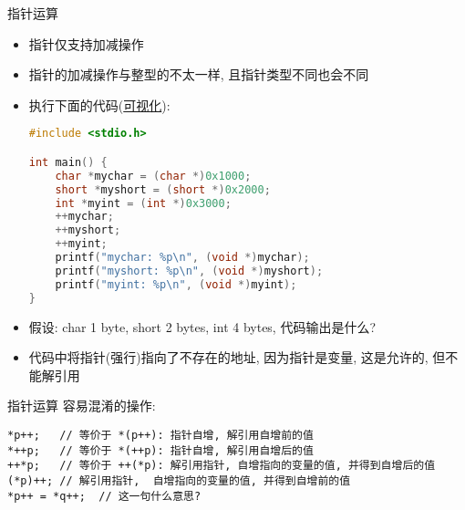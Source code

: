 \begin{frame}[fragile]{指针运算}
    \begin{itemize}[<+- | alert@+>]
        \item 指针仅支持加减操作
        \item 指针的加减操作与整型的不太一样, 且指针类型不同也会不同
        \item 执行下面的代码(\href{http://pythontutor.com/c.html#code=\%23include\%20\%3Cstdio.h\%3E\%0A\%0Aint\%20main\%28\%29\%20\%7B\%0A\%20\%20char\%20*mychar\%20\%3D\%20\%28char\%20*\%290x1000\%3B\%0A\%20\%20short\%20*myshort\%20\%3D\%20\%28short\%20*\%290x2000\%3B\%0A\%20\%20int\%20*myint\%20\%3D\%20\%28int\%20*\%290x3000\%3B\%0A\%20\%20\%2B\%2Bmychar\%3B\%0A\%20\%20\%2B\%2Bmyshort\%3B\%0A\%20\%20\%2B\%2Bmyint\%3B\%0A\%20\%20printf\%28\%22mychar\%3A\%20\%25p\%5Cn\%22,\%20\%28void\%20*\%29mychar\%29\%3B\%0A\%20\%20printf\%28\%22myshort\%3A\%20\%25p\%5Cn\%22,\%20\%28void\%20*\%29myshort\%29\%3B\%0A\%20\%20printf\%28\%22myint\%3A\%20\%25p\%5Cn\%22,\%20\%28void\%20*\%29myint\%29\%3B\%0A\%7D&mode=edit&origin=opt-frontend.js&py=c&rawInputLstJSON=\%5B\%5D}{可视化}):
        \scriptsize\begin{lstlisting}[language=c]
#include <stdio.h>

int main() {
    char *mychar = (char *)0x1000;
    short *myshort = (short *)0x2000;
    int *myint = (int *)0x3000;
    ++mychar;
    ++myshort;
    ++myint;
    printf("mychar: %p\n", (void *)mychar);
    printf("myshort: %p\n", (void *)myshort);
    printf("myint: %p\n", (void *)myint);
}
        \end{lstlisting}
        \item 假设: char 1 byte, short 2 bytes, int 4 bytes, 代码输出是什么?
        \item 代码中将指针(强行)指向了不存在的地址, 因为指针是变量, 这是允许的, 但不能解引用
    \end{itemize}
\end{frame}

\begin{frame}[fragile]{指针运算}
    容易混淆的操作:
    \scriptsize\begin{verbatim}
*p++;   // 等价于 *(p++): 指针自增, 解引用自增前的值
*++p;   // 等价于 *(++p): 指针自增, 解引用自增后的值
++*p;   // 等价于 ++(*p): 解引用指针, 自增指向的变量的值, 并得到自增后的值
(*p)++; // 解引用指针,  自增指向的变量的值, 并得到自增前的值
*p++ = *q++;  // 这一句什么意思?
    \end{verbatim}
\end{frame}

